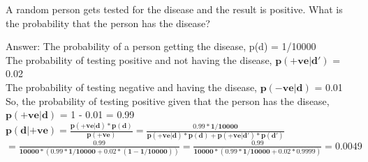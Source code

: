\documentclass{article}%
\begin{document}
\begin{enumerate}
    A random person gets tested for the disease and the result is positive. What is the probability that the person has the disease?

    Answer: The probability of a person getting the disease, p(d) = 1/10000 \\
    The probability of testing positive and not having the disease, $\mathbf{ p(+ve|d') }$ = 0.02 \\
    The probability of testing negative and having the disease, $\mathbf{ p(-ve|d) }$ = 0.01 \\
    So, the probability of testing positive given that the person has the disease, $\mathbf{ p(+ve|d) }$ = 1 - 0.01 = 0.99 \\
    $\mathbf{ p(d|+ve) = \frac{p(+ve|d) * p(d)}{p(+ve)} = \frac{0.99 * 1/10000}{p(+ve|d)*p(d) + p(+ve|d')*p(d')}}$ \\
    $\mathbf{ = \frac{0.99}{10000 * (0.99 * 1/10000 + 0.02 * (1 - 1/10000))} = \frac{0.99}{10000 * (0.99 * 1/10000 + 0.02 * 0.9999)} = 0.0049 }$
\end{enumerate}
\end{document}

